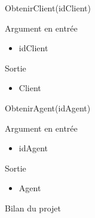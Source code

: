 \documentclass[xetex]{beamer}
\begin{document}
\begin{frame}{ObtenirClient(idClient)}

\noindent  Argument en entrée
\begin{itemize}
\item idClient \\
\end{itemize}


\noindent Sortie
\begin{itemize}
\item Client
\end{itemize}

\end{frame}

\begin{frame}{ObtenirAgent(idAgent)}

\noindent  Argument en entrée
\begin{itemize}
\item idAgent \\ 
\end{itemize}

\noindent Sortie
\begin{itemize}
\item Agent 
\end{itemize} 

\end{frame}
    
\begin{frame}{Bilan du projet}
  \begin{figure}
	
  \end{figure}
\end{frame}
\end{document}
